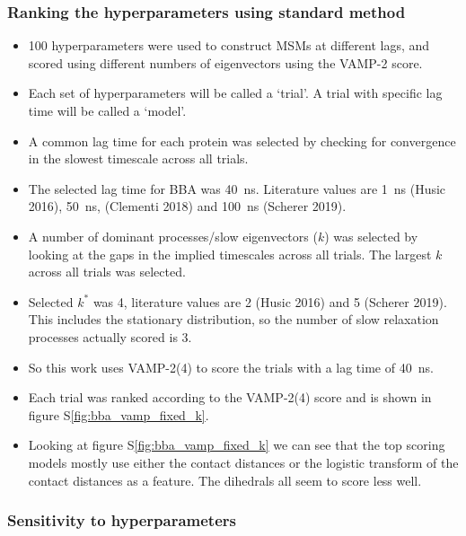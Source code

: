\documentclass[journal=jacsat,manuscript=article]{achemso}
\newcommand*\sref[1]{%
    S\ref{#1}}
\begin{document}
\subsubsection{Ranking the hyperparameters using standard method}

\begin{itemize}
    \item 100 hyperparameters were used to construct MSMs at different lags, and scored using different numbers of eigenvectors using the VAMP-2 score. 
    \item Each set of hyperparameters will be called a  `trial'.  A trial with specific lag time will be called a `model'. 
    \item A common lag time for each protein was selected by checking for convergence in the slowest timescale across all trials. 
    \item The selected lag time for BBA was \SI{40}{\nano\second}. Literature values are  \SI{1}{\nano\second} (Husic 2016),  \SI{50}{\nano\second}, (Clementi 2018) and   \SI{100}{\nano\second} (Scherer 2019).
    \item A number of dominant processes/slow eigenvectors ($k$) was selected by looking at the gaps in the implied timescales across all trials.  The largest $k$ across all trials was selected. 
    \item Selected $k^{*}$ was \num{4}, literature values are \num{2} (Husic 2016) and \num{5} (Scherer 2019). This includes the stationary distribution, so the number of slow relaxation processes actually scored is \num{3}.  
    \item So this work uses VAMP-2(4) to score the trials with a lag time of \SI{40}{\nano\second}. 
    \item Each trial was ranked according to the VAMP-2(4) score and is shown in figure \sref{fig:bba_vamp_fixed_k}. 
    \item Looking at figure \sref{fig:bba_vamp_fixed_k} we can see that the top scoring models mostly use either the contact distances or the logistic transform of the contact distances as a feature.  The dihedrals all seem to score less well. 
\end{itemize}

\subsubsection{Sensitivity to hyperparameters}
\end{document}
